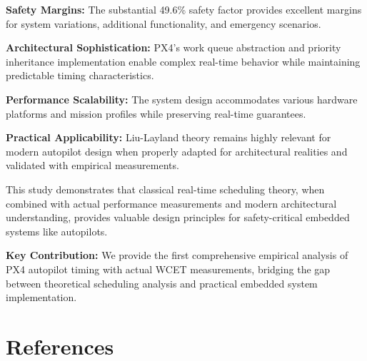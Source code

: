 \documentclass[12pt,a4paper]{article}
\begin{document}
\textbf{Safety Margins:} The substantial 49.6\% safety factor provides excellent margins for system variations, additional functionality, and emergency scenarios.

\textbf{Architectural Sophistication:} PX4's work queue abstraction and priority inheritance implementation enable complex real-time behavior while maintaining predictable timing characteristics.

\textbf{Performance Scalability:} The system design accommodates various hardware platforms and mission profiles while preserving real-time guarantees.

\textbf{Practical Applicability:} Liu-Layland theory remains highly relevant for modern autopilot design when properly adapted for architectural realities and validated with empirical measurements.

This study demonstrates that classical real-time scheduling theory, when combined with actual performance measurements and modern architectural understanding, provides valuable design principles for safety-critical embedded systems like autopilots.

\textbf{Key Contribution:} We provide the first comprehensive empirical analysis of PX4 autopilot timing with actual WCET measurements, bridging the gap between theoretical scheduling analysis and practical embedded system implementation.

\section{References}
\end{document}
